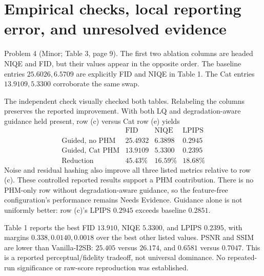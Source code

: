 \documentclass[10pt]{article}
\begin{document}
\section*{Empirical checks, local reporting error, and unresolved evidence}
Problem 4 (Minor; Table 3, page 9).  The first two ablation columns are headed NIQE and FID, but their values appear in the opposite order. The baseline entries \(25.6026,6.5709\) are explicitly FID and NIQE in Table 1. The Cat entries \(13.9109,5.3300\) corroborate the same swap.\par
The independent check visually checked both tables. Relabeling the columns preserves the reported improvement. With both LQ and degradation-aware guidance held present, row (c) versus Cat row (e) yields \[\begin{array}{c|rrr}
 &\mathrm{FID}&\mathrm{NIQE}&\mathrm{LPIPS}\\ \hline
 \text{Guided, no PHM}&25.4932&6.3898&0.2945\\
 \text{Guided, Cat PHM}&13.9109&5.3300&0.2395\\
 \text{Reduction}&45.43\%&16.59\%&18.68\%
 \end{array}\] Noise and residual hashing also improve all three listed metrics relative to row (c). These controlled reported results support a PHM contribution. There is no PHM-only row without degradation-aware guidance, so the feature-free configuration’s performance remains Needs Evidence. Guidance alone is not uniformly better: row (c)’s LPIPS \(0.2945\) exceeds baseline \(0.2851\).\par
Table 1 reports the best FID \(13.910\), NIQE \(5.3300\), and LPIPS \(0.2395\), with margins \(0.338,0.0140,0.0018\) over the best other listed values. PSNR and SSIM are lower than Vanilla-I2SB: \(25.405\) versus \(26.174\), and \(0.6581\) versus \(0.7047\). This is a reported perceptual/fidelity tradeoff, not universal dominance. No repeated-run significance or raw-score reproduction was established.\par
\end{document}
